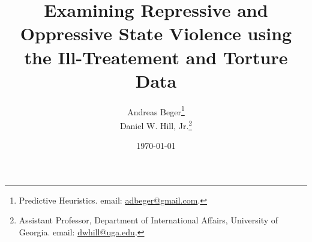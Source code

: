 \documentclass[11pt]{article}
\begin{document}
\date{\today}
\title{Examining Repressive and Oppressive State Violence using the Ill-Treatement and Torture Data}
\author{Andreas Beger\thanks{Predictive Heuristics. email: \href{mailto:adbeger@gmail.com}{adbeger@gmail.com}.} \\
Daniel W. Hill, Jr.\thanks{Assistant Professor, Department of International Affairs, University of Georgia. email: \href{mailto:dwhill@uga.edu}{dwhill@uga.edu}.}}

\maketitle 

\begin{abstract}

\end{abstract}

\clearpage
\setcounter{page}{1}

\doublespace
\end{document}

